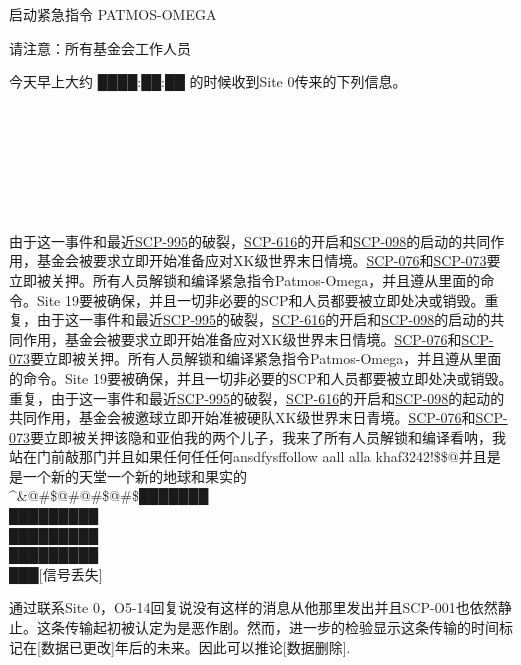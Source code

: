 \begin{scpbox}

启动紧急指令 PATMOS-OMEGA

请注意：所有基金会工作人员

今天早上大约 ████:██:██ 的时候收到Site 0传来的下列信息。

\\

\\
\\
\\
\\

由于这一事件和最近\hyperref[chap:SCP-995]{SCP-995}的破裂，\hyperref[chap:SCP-616]{SCP-616}的开启和\hyperref[chap:SCP-098]{SCP-098}的启动的共同作用，基金会被要求立即开始准备应对XK级世界末日情境。\hyperref[chap:SCP-076]{SCP-076}和\hyperref[chap:SCP-073]{SCP-073}要立即被关押。所有人员解锁和编译紧急指令Patmos-Omega，并且遵从里面的命令。Site 19要被确保，并且一切非必要的SCP和人员都要被立即处决或销毁。重复，由于这一事件和最近\hyperref[chap:SCP-995]{SCP-995}的破裂，\hyperref[chap:SCP-616]{SCP-616}的开启和\hyperref[chap:SCP-098]{SCP-098}的启动的共同作用，基金会被要求立即开始准备应对XK级世界末日情境。\hyperref[chap:SCP-076]{SCP-076}和\hyperref[chap:SCP-073]{SCP-073}要立即被关押。所有人员解锁和编译紧急指令Patmos-Omega，并且遵从里面的命令。Site 19要被确保，并且一切非必要的SCP和人员都要被立即处决或销毁。重复，由于这一事件和最近\hyperref[chap:SCP-995]{SCP-995}的破裂，\hyperref[chap:SCP-616]{SCP-616}的开启和\hyperref[chap:SCP-098]{SCP-098}的起动的共同作用，基金会被邀球立即开始准被硬队XK级世界末日青境。\hyperref[chap:SCP-076]{SCP-076}和\hyperref[chap:SCP-073]{SCP-073}要立即被关押该隐和亚伯我的两个儿子，我来了所有人员解锁和编译看呐，我站在门前敲那门并且如果任何任任何ansdfysffollow aall alla khaf3242!\$\$@并且是是一个新的天堂一个新的地球和果实的\\
\textasciicircum \&@\#\$@\#@\#\$@\#\$███████\\
█████████\\
█████████\\
█████████\\
███{[}信号丢失]

\end{scpbox}

通过联系Site 0，O5-14回复说没有这样的消息从他那里发出并且SCP-001也依然静止。这条传输起初被认定为是恶作剧。然而，进一步的检验显示这条传输的时间标记在{[}数据已更改]年后的未来。因此可以推论{[}数据删除].

\hr
